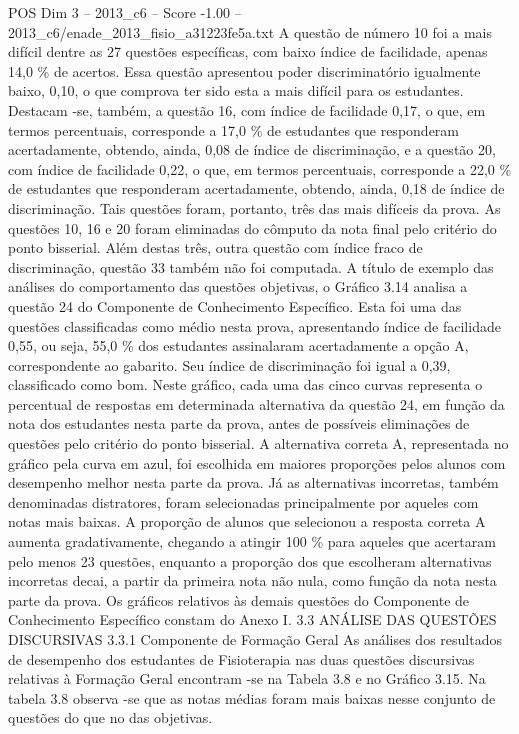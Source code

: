 \begin{textsample}{POS Dim 3 – 2013\_c6 – Score -1.00 – 2013\_c6/enade\_2013\_fisio\_a31223fe5a.txt}
A questão de número 10 foi a mais difícil dentre as 27 questões específicas, com baixo índice de facilidade, apenas 14,0 \% de acertos.
Essa questão apresentou poder discriminatório igualmente baixo, 0,10, o que comprova ter sido esta a mais difícil para os estudantes.
Destacam -se, também, a questão 16, com índice de facilidade 0,17, o que, em termos percentuais, corresponde a 17,0 \% de estudantes que responderam acertadamente, obtendo, ainda, 0,08 de índice de discriminação, e a questão 20, com índice de facilidade 0,22, o que, em termos percentuais, corresponde a 22,0 \% de estudantes que responderam acertadamente, obtendo, ainda, 0,18 de índice de discriminação.
Tais questões foram, portanto, três das mais difíceis da prova.
As questões 10, 16 e 20 foram eliminadas do cômputo da nota final pelo critério do ponto bisserial.
Além destas três, outra questão com índice fraco de discriminação, questão 33 também não foi computada.
A título de exemplo das análises do comportamento das questões objetivas, o Gráfico 3.14 analisa a questão 24 do Componente de Conhecimento Específico.
Esta foi uma das questões classificadas como médio nesta prova, apresentando índice de facilidade 0,55, ou seja, 55,0 \% dos estudantes assinalaram acertadamente a opção A, correspondente ao gabarito.
Seu índice de discriminação foi igual a 0,39, classificado como bom.
Neste gráfico, cada uma das cinco curvas representa o percentual de respostas em determinada alternativa da questão 24, em função da nota dos estudantes nesta parte da prova, antes de possíveis eliminações de questões pelo critério do ponto bisserial.
A alternativa correta A, representada no gráfico pela curva em azul, foi escolhida em maiores proporções pelos alunos com desempenho melhor nesta parte da prova.
Já as alternativas incorretas, também denominadas distratores, foram selecionadas principalmente por aqueles com notas mais baixas.
A proporção de alunos que selecionou a resposta correta A aumenta gradativamente, chegando a atingir 100 \% para aqueles que acertaram pelo menos 23 questões, enquanto a proporção dos que escolheram alternativas incorretas decai, a partir da primeira nota não nula, como função da nota nesta parte da prova.
Os gráficos relativos às demais questões do Componente de Conhecimento Específico constam do Anexo I. 3.3 ANÁLISE DAS QUESTÕES DISCURSIVAS 3.3.1 Componente de Formação Geral As análises dos resultados de desempenho dos estudantes de Fisioterapia nas duas questões discursivas relativas à Formação Geral encontram -se na Tabela 3.8 e no Gráfico 3.15.
Na tabela 3.8 observa -se que as notas médias foram mais baixas nesse conjunto de questões do que no das objetivas.

\end{textsample}
